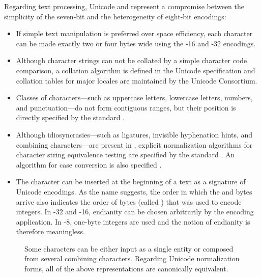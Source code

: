 Regarding text processing, Unicode and  represent a compromise
between the simplicity of the seven-bit  and the heterogeneity of
eight-bit encodings:
\begin{itemize}
  \item If simple text manipulation is preferred over space efficiency, each
    character can be made exactly two or four bytes wide using the
    -16 and -32 encodings.
  \item Although character strings can not be collated by a simple character
    code comparison, a collation algorithm is defined in the Unicode
    specification \cite{unicode15:collation} and collation tables for major
    locales \cite{unicode15:cldr} are maintained by the Unicode Consortium.
  \item Classes of characters---such as uppercase letters, lowercase letters,
    numbers, and punctuation---do not form contiguous ranges, but their position
    is directly specified by the standard \cite[sec.\,4.5]{unicode15}.
  \item Although idiosyncrasies---such as ligatures, invisible hyphenation
    hints, and combining characters---are present in , explicit
    normalization algorithms for character string equivalence testing are
    specified by the standard \cite[sec.\,2.12]{unicode15}. An algorithm
    for case conversion is also specified \cite[sec.\,3.13]{unicode15}.
  \item The  character can be inserted at the
    beginning of a text as a signature of Unicode encodings. As the name
    suggests, the order in which the  and  bytes arrive also
    indicates the order of bytes (called ) that was used to
    encode integers. In -32 and -16, endianity
    can be chosen arbitrarily by the encoding application. In -8,
    one-byte integers are used and the notion of endianity is therefore
    meaningless.
\end{itemize}

\begin{figure}
  
  \caption{Some  characters can be either input as a single
    entity or composed from several combining characters. Regarding Unicode
    normalization forms, all of the above representations are canonically
    equivalent.}
\end{figure}


